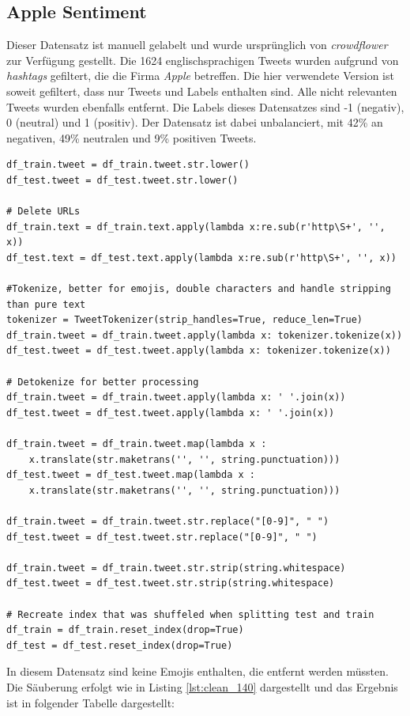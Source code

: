 
\subsection{Apple Sentiment}
\label{sec:applesent}
Dieser Datensatz ist manuell gelabelt und wurde urspr\"unglich von \textit{crowdflower} \cite{crowdflower} zur Verf\"ugung gestellt. Die 1624 englischsprachigen Tweets wurden aufgrund von \textit{hashtags} gefiltert, die die Firma \textit{Apple} betreffen. Die hier verwendete Version \cite{apple_sent} ist soweit gefiltert, dass nur Tweets und Labels enthalten sind. Alle nicht relevanten Tweets wurden ebenfalls entfernt. Die Labels dieses Datensatzes sind -1 (negativ), 0 (neutral) und 1 (positiv). Der Datensatz ist dabei unbalanciert, mit 42\% an negativen, 49\% neutralen und 9\% positiven Tweets.\\
\lstset{language=Python}
\lstset{frame=lines}
\lstset{captionpos=b}
\lstset{basicstyle=\footnotesize}
\begin{lstlisting}
df_train.tweet = df_train.tweet.str.lower()
df_test.tweet = df_test.tweet.str.lower()

# Delete URLs
df_train.text = df_train.text.apply(lambda x:re.sub(r'http\S+', '', x))
df_test.text = df_test.text.apply(lambda x:re.sub(r'http\S+', '', x))

#Tokenize, better for emojis, double characters and handle stripping than pure text
tokenizer = TweetTokenizer(strip_handles=True, reduce_len=True)
df_train.tweet = df_train.tweet.apply(lambda x: tokenizer.tokenize(x))
df_test.tweet = df_test.tweet.apply(lambda x: tokenizer.tokenize(x))

# Detokenize for better processing
df_train.tweet = df_train.tweet.apply(lambda x: ' '.join(x))
df_test.tweet = df_test.tweet.apply(lambda x: ' '.join(x))

df_train.tweet = df_train.tweet.map(lambda x : 
	x.translate(str.maketrans('', '', string.punctuation)))
df_test.tweet = df_test.tweet.map(lambda x : 
	x.translate(str.maketrans('', '', string.punctuation)))

df_train.tweet = df_train.tweet.str.replace("[0-9]", " ")
df_test.tweet = df_test.tweet.str.replace("[0-9]", " ")

df_train.tweet = df_train.tweet.str.strip(string.whitespace)
df_test.tweet = df_test.tweet.str.strip(string.whitespace)

# Recreate index that was shuffeled when splitting test and train
df_train = df_train.reset_index(drop=True)
df_test = df_test.reset_index(drop=True)
\end{lstlisting}
In diesem Datensatz sind keine Emojis enthalten, die entfernt werden m\"ussten. Die S\"auberung erfolgt wie in Listing \ref{lst:clean_140} dargestellt und das Ergebnis ist in folgender Tabelle dargestellt:

